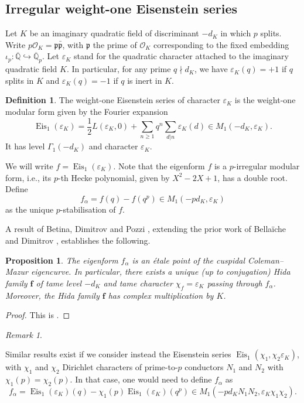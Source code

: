 \documentclass[a4paper,11pt]{amsart}
\theoremstyle{plain}
\newtheorem{propo}[theorem]{Proposition}
\theoremstyle{definition}
\newtheorem{defi}[theorem]{Definition}
\theoremstyle{remark}
\newtheorem{remarkwr}[theorem]{Remark}
\newenvironment{remark}{\begin{remarkwr}\begin{upshape}}{\end{upshape}\end{remarkwr}}
\DeclareMathOperator{\Eis}{Eis}
\newcommand{\hf}{{\mathbf{f}}}
\numberwithin{equation}{section}
\begin{document}
\subsection{Irregular weight-one Eisenstein series}\label{subsec:wt1}

Let $K$ be an imaginary quadratic field of discriminant $-d_K$ in which $p$ splits. Write $p \mathcal O_K = \mathfrak p \bar{\mathfrak p}$, with $\mathfrak p$ the prime of $\mathcal O_K$ corresponding to the fixed embedding $\iota_p \colon \overline{\mathbb Q} \hookrightarrow \overline{\mathbb Q}_p$. Let $\varepsilon_K$ stand for the quadratic character attached to the imaginary quadratic field $K$. In particular, for any prime $q\nmid d_K$, we have $\varepsilon_K(q) = +1$ if $q$ splits in $K$ and $\varepsilon_K(q) = -1$ if $q$ is inert in $K$.

\begin{defi}
The weight-one Eisenstein series of character $\varepsilon_K$ is the weight-one modular form given by the Fourier expansion \[ \Eis_1(\varepsilon_K) = \frac{1}{2} L(\varepsilon_K,0) + \sum_{n \geq 1} q^n \sum_{d|n} \varepsilon_K(d) \in M_1(-d_K, \varepsilon_K). \] It has level $\Gamma_1(-d_K)$ and character $\varepsilon_K$. 
\end{defi} 

We will write $f=\Eis_1(\varepsilon_K)$. Note that the eigenform $f$ is a $p$-irregular modular form, i.e., its $p$-th Hecke polynomial, given by $X^2-2X+1$, has a double root. Define \[ f_\alpha = f(q) - f(q^p) \in M_1(-pd_K, \varepsilon_K) \] as the unique $p$-stabilisation of $f$.

A result of Betina, Dimitrov and Pozzi \cite{pozzi-thesis}, \cite{BeDiPo} extending the prior work of Bella\"iche and Dimitrov \cite{bellaiche-dimitrov}, establishes the following.

\begin{propo}
The eigenform $f_\alpha$ is an \'etale point of the cuspidal Coleman--Mazur eigencurve. In particular, there exists a unique (up to conjugation) Hida family $\hf$ of tame level $-d_K$ and tame character $\chi_f = \varepsilon_K$ passing through $f_\alpha$. Moreover, the Hida family $\hf$ has complex multiplication by $K$.
\end{propo}
\begin{proof}
This is \cite[Thm. A]{BeDiPo}.
\end{proof}

\begin{remark}
Similar results exist if we consider instead the Eisenstein series $\Eis_1(\chi_1,\chi_2 \varepsilon_K)$, with $\chi_1$ and $\chi_2$ Dirichlet characters of prime-to-$p$ conductors $N_1$ and $N_2$ with $\chi_1(p)=\chi_2(p)$. In that case, one would need to define $f_\alpha$ as \[ f_\alpha = \Eis_1(\varepsilon_K)(q) - \chi_1(p) \Eis_1(\varepsilon_K)(q^p) \in M_1(-pd_KN_1N_2, \varepsilon_K \chi_1 \chi_2). \]
\end{remark}
\end{document}
